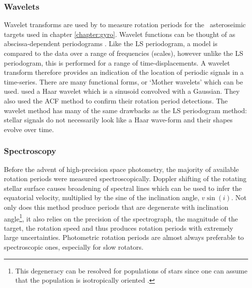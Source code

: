\subsubsection{Wavelets}
Wavelet transforms are used by \citet{Garcia2014} to measure rotation periods
for the \kepler\ asteroseimic targets used in chapter \ref{chapter:gyro}.
Wavelet functions can be thought of as abscissa-dependent periodograms
\citep{Carter2009}.
Like the LS periodogram, a model is compared to the data over a range of
frequencies (scales), however unlike the LS periodogram, this is performed for
a range of time-displacements.
A wavelet transform therefore provides an indication of the location of
periodic signals in a time-series.
There are many functional forms, or `Mother wavelets' which can be used.
\citet{Garcia2014} used a Haar wavelet which is a sinusoid convolved with a
Gaussian.
They also used the ACF method to confirm their rotation period detections.
The wavelet method has many of the same drawbacks as the LS periodogram
method: stellar signals do not necessarily look like a Haar wave-form and
their shapes evolve over time.

\subsubsection{Spectroscopy}
Before the advent of high-precision space photometry, the majority of
available rotation periods were measured spectroscopically.
Doppler shifting of the rotating stellar surface causes broadening of spectral
lines which can be used to infer the equatorial velocity, multiplied by the
sine of the inclination angle, $v\sin(i)$.
Not only does this method produce periods that are degenerate with inclination
angle\footnote{This degeneracy can be resolved for populations of stars since
one can assume that the population is isotropically oriented
\citep[\eg][]{Andrews2014}.}, it also relies on the precision of the
spectrograph, the magnitude of the target, the rotation speed and thus
produces rotation periods with extremely large uncertainties.
Photometric rotation periods are almost always preferable to spectroscopic
ones, especially for slow rotators.
